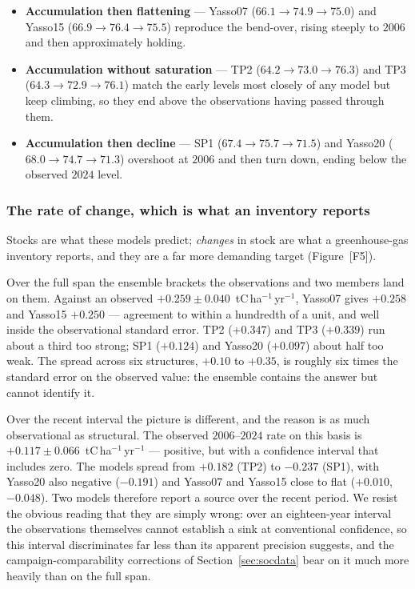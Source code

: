 \documentclass[11pt]{article}
\begin{document}
\begin{itemize}
\item \textbf{Accumulation then flattening} --- Yasso07 ($66.1 \to 74.9 \to
  75.0$) and Yasso15 ($66.9 \to 76.4 \to 75.5$) reproduce the bend-over,
  rising steeply to $2006$ and then approximately holding.
\item \textbf{Accumulation without saturation} --- TP2 ($64.2 \to 73.0 \to
  76.3$) and TP3 ($64.3 \to 72.9 \to 76.1$) match the early levels most
  closely of any model but keep climbing, so they end above the observations
  having passed through them.
\item \textbf{Accumulation then decline} --- SP1 ($67.4 \to 75.7 \to 71.5$) and
  Yasso20 ($68.0 \to 74.7 \to 71.3$) overshoot at $2006$ and then turn down,
  ending below the observed $2024$ level.
\end{itemize}

\subsubsection{The rate of change, which is what an inventory reports}
Stocks are what these models predict; \emph{changes} in stock are what a
greenhouse-gas inventory reports, and they are a far more demanding target
(Figure~[F5]).

Over the full span the ensemble brackets the observations and two members land
on them. Against an observed $+0.259 \pm 0.040$~tC\,ha$^{-1}$\,yr$^{-1}$,
Yasso07 gives $+0.258$ and Yasso15 $+0.250$ --- agreement to within a hundredth
of a unit, and well inside the observational standard error. TP2 ($+0.347$) and
TP3 ($+0.339$) run about a third too strong; SP1 ($+0.124$) and Yasso20
($+0.097$) about half too weak. The spread across six structures, $+0.10$ to
$+0.35$, is roughly six times the standard error on the observed value: the
ensemble contains the answer but cannot identify it.

Over the recent interval the picture is different, and the reason is as much
observational as structural. The observed $2006$--$2024$ rate on this basis is
$+0.117 \pm 0.066$~tC\,ha$^{-1}$\,yr$^{-1}$ --- positive, but with a confidence
interval that includes zero. The models spread from $+0.182$ (TP2) to $-0.237$
(SP1), with Yasso20 also negative ($-0.191$) and Yasso07 and Yasso15 close to
flat ($+0.010$, $-0.048$). Two models therefore report a source over the recent
period. We resist the obvious reading that they are simply wrong: over an
eighteen-year interval the observations themselves cannot establish a sink at
conventional confidence, so this interval discriminates far less than its
apparent precision suggests, and the campaign-comparability corrections of
Section~\ref{sec:socdata} bear on it much more heavily than on the full span.
\end{document}
